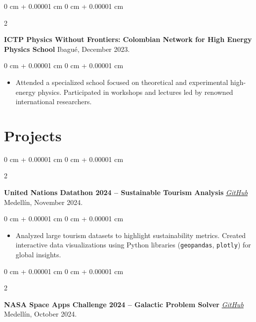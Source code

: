 \documentclass[10pt, letterpaper]{article}
\newenvironment{highlights}{
    \begin{itemize}[
        topsep=0.10 cm,
        parsep=0.10 cm,
        partopsep=0pt,
        itemsep=0pt,
        leftmargin=0 cm + 10pt
    ]
}{
    \end{itemize}
} %
\newenvironment{onecolentry}{
    \begin{adjustwidth}{
        0 cm + 0.00001 cm
    }{
        0 cm + 0.00001 cm
    }
}{
    \end{adjustwidth}
} %
\newenvironment{twocolentry}[2][]{
    \onecolentry
    \def\secondColumn{#2}
    \setcolumnwidth{\fill, 4.5 cm}
    \begin{paracol}{2}
}{
    \switchcolumn \raggedleft \secondColumn
    \end{paracol}
    \endonecolentry
} %
\begin{document}
        \vspace{0.2 cm}

        \begin{twocolentry}{
            Ibagué, December 2023.
        }
            \textbf{ICTP Physics Without Frontiers: Colombian Network for High Energy Physics School}\end{twocolentry}

        \vspace{0.10 cm}
        \begin{onecolentry}
            \begin{highlights}
                \item Attended a specialized school focused on theoretical and experimental high-energy physics. Participated in workshops and lectures led by renowned international researchers.
            \end{highlights}
        \end{onecolentry}


        \vspace{0.2 cm}
    
    \section{Projects}
        
        \begin{twocolentry}{
            Medellín, November 2024.
        }
            \textbf{United Nations Datathon 2024 -- Sustainable Tourism Analysis} \textit{\href{https://github.com/JuanJ27/UN-Datathon-sisifos}{GitHub}}\end{twocolentry}

        \vspace{0.10 cm}
        \begin{onecolentry}
            \begin{highlights}
                \item Analyzed large tourism datasets to highlight sustainability metrics. Created interactive data visualizations using Python libraries (\texttt{geopandas}, \texttt{plotly}) for global insights.
            \end{highlights}
        \end{onecolentry}

        \begin{twocolentry}{
            Medellín, October 2024.
        }
            \textbf{NASA Space Apps Challenge 2024 -- Galactic Problem Solver} \textit{\href{https://github.com/tonnysoyyo/NASA-Space-Apps}{GitHub}}\end{twocolentry}
\end{document}
